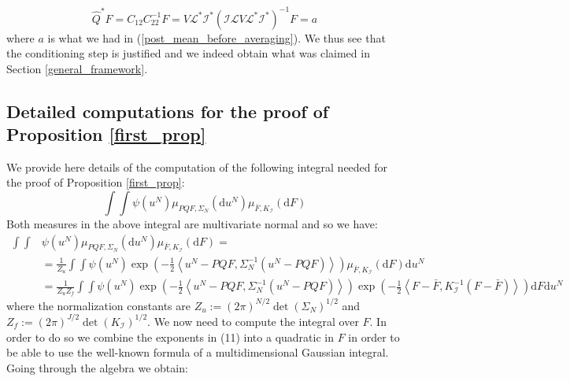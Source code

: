 \begin{equation}
    \hat{Q}^{*}F=C_{12}C_{22}^{-1}F=V\mathcal{L}^{*}\mathcal{I}^{*}(\mathcal{I}\mathcal{L}V\mathcal{L}^{*}\mathcal{I}^{*})^{-1}F=a
\end{equation}
where $a$ is what we had in (\ref{post_mean_before_averaging}). We thus see that the conditioning step is justified and we indeed obtain what was claimed in Section \textcolor{blue}{\ref{general_framework}}. \qedsymbol

\subsection{Detailed computations for the proof of Proposition \textcolor{blue}{\ref{first_prop}}}

We provide here details of the computation of the following integral needed for the proof of Proposition \textcolor{blue}{\ref{first_prop}}:
\begin{equation*}
    \int\int\psi(u^{N})\mu_{PQF,\Sigma_N}(\mathrm{d}u^{N})\mu_{\bar{F},K_{\mathcal{I}}}(\mathrm{d}F)
\end{equation*}
Both measures in the above integral are multivariate normal and so we have:
\begin{align}
    \int\int&\psi(u^{N})\mu_{PQF,\Sigma_N}(\mathrm{d}u^{N})\mu_{\bar{F},K_{\mathcal{I}}}(\mathrm{d}F)= \nonumber \\ &=\frac{1}{Z_u}\int\int\psi(u^{N})\exp\left(-\frac{1}{2}\left\langle u^{N}-PQF,\Sigma_{N}^{-1}(u^{N}-PQF) \right\rangle\right)\mu_{\bar{F},K_{\mathcal{I}}}(\mathrm{d}F)\mathrm{d}u^{N} \nonumber \\
    &=\frac{1}{Z_{u}Z_{f}}\int\int\psi(u^{N})\exp\left(-\frac{1}{2}\left\langle u^{N}-PQF,\Sigma_{N}^{-1}(u^{N}-PQF)\right\rangle\right)\exp\left(-\frac{1}{2}\left\langle F-\bar{F},K_{\mathcal{I}}^{-1}(F-\bar{F}) \right\rangle\right)\mathrm{d}F\mathrm{d}u^{N}
\end{align}
where the normalization constants are $Z_u:=(2\pi)^{N/2}\det(\Sigma_N)^{1/2}$ and $Z_f:=(2\pi)^{J/2}\det(K_\mathcal{I})^{1/2}$. We now need to compute the integral over $F$. In order to do so we combine the exponents in (11) into a quadratic in $F$ in order to be able to use the well-known formula of a multidimensional Gaussian integral. Going through the algebra we obtain:


